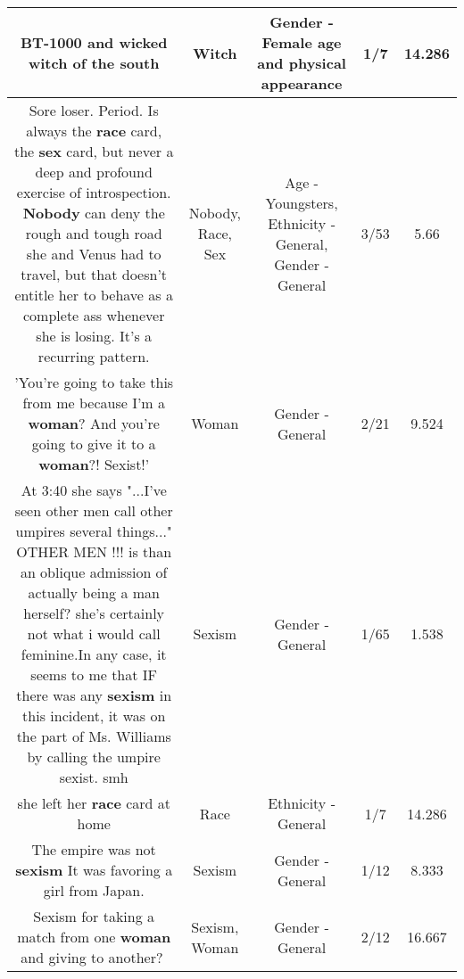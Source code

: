 \documentclass[11pt]{article}
\newlength\mylength
\begin{document}
\begin{center}
\begin{longtable}{|C{.65\mylength}|C{.30\mylength}|C{.12\mylength}|C{.12\mylength}|C{.12\mylength}|}
  \small BT-1000 and wicked \textbf{witch} of the south\normalsize   & Witch & Gender - Female age and physical appearance & 1/7 & 14.286 \\  \hline
  \small Sore loser. Period. Is always the \textbf{race} card, the \textbf{sex} card, but never a deep and profound exercise of introspection. \textbf{Nobody} can deny the rough and tough road she and Venus had to travel, but that doesn't entitle her to behave as a complete ass whenever she is losing. It's a recurring pattern.\normalsize   & Nobody, Race, Sex & Age - Youngsters, Ethnicity - General, Gender - General & 3/53 & 5.66 \\  \hline
  \small 'You're going to take this from me because I'm a \textbf{woman}? And you're going to give it to a \textbf{woman}?! Sexist!'\normalsize   & Woman & Gender - General & 2/21 & 9.524 \\  \hline
  \small At 3:40 she says "...I've seen other men call other umpires several things..." OTHER MEN !!! is than an oblique admission of actually being a man herself? she's certainly not what i would call feminine.In any case, it seems to me that IF there was any \textbf{sexism} in this incident, it was on the part of Ms. Williams by calling the umpire sexist. smh\normalsize   & Sexism & Gender - General & 1/65 & 1.538 \\  \hline
  \small she left her \textbf{race} card at home\normalsize   & Race & Ethnicity - General & 1/7 & 14.286 \\  \hline
  \small The empire was not \textbf{sexism} It was favoring a girl from Japan.\normalsize   & Sexism & Gender - General & 1/12 & 8.333 \\  \hline
  \small Sexism for taking a match from one \textbf{woman} and giving to another?🤔\normalsize   & Sexism, Woman & Gender - General & 2/12 & 16.667 \\  \hline

\end{longtable}
\end{center}
\end{document}
